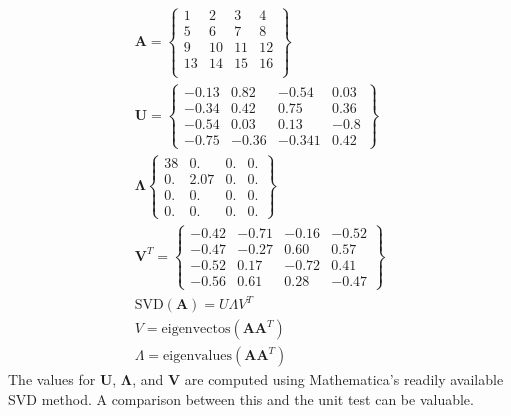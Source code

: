 \documentclass[11pt]{article}
\begin{document}
\begin{eqnarray}
\mathbf{A}= 
\left\{
\begin{array}{llll}
1	& 	2 	& 	3	& 	4 \\
5	&	6	& 	7	& 	8 \\
9	&	10	&	11	&	12 \\
13	&	14	&	15	&	16 \\
\end{array}
\right\} \\
\mathbf{U} = 
\left\{
\begin{array}{llll}
-0.13		& 0.82	& -0.54	& 0.03 \\
-0.34 	& 0.42	&  0.75	& 0.36	\\
-0.54		& 0.03	& 0.13	& -0.8	\\
-0.75		& -0.36	& -0.341	& 0.42
\end{array}
\right\} \\
\mathbf{\Lambda}
\left\{
\begin{array}{llll}
38	& 0. 		& 0. 	&  0.\\
0.		& 2.07	& 0.	& 0.\\
0.		& 0.		& 0.	& 0.\\
0.		& 0.		& 0.	& 0.
\end{array}
\right\} \\
\mathbf{V}^T =
\left\{
\begin{array}{llll}
-0.42		& -0.71	& -0.16	& -0.52	\\
-0.47		& -0.27	& 0.60	& 0.57	\\
-0.52		& 0.17	& -0.72	& 0.41	\\
-0.56		& 0.61	& 0.28	& -0.47
\end{array}
\right\} \\
\textrm{SVD} (\mathbf{A}) = U \Lambda V^T \\
V = \textrm{eigenvectos}(\mathbf{A}\mathbf{A}^T) \\
\Lambda = \textrm{eigenvalues}(\mathbf{A}\mathbf{A}^T) 
\end{eqnarray}
The values for $\mathbf{U}$, $\mathbf{\Lambda}$, and $\mathbf{V}$ are computed using Mathematica's readily available SVD method.   A comparison between this and the unit test can be valuable. 

\end{document}
